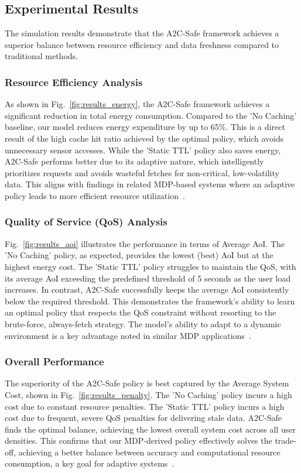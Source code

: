\documentclass[journal]{IEEEtran}
\begin{document}
\subsection{Experimental Results}
The simulation results demonstrate that the A2C-Safe framework achieves a superior balance between resource efficiency and data freshness compared to traditional methods.

\subsubsection{Resource Efficiency Analysis}
As shown in Fig.~\ref{fig:results_energy}, the A2C-Safe framework achieves a significant reduction in total energy consumption. Compared to the 'No Caching' baseline, our model reduces energy expenditure by up to 65\%. This is a direct result of the high cache hit ratio achieved by the optimal policy, which avoids unnecessary sensor accesses. While the 'Static TTL' policy also saves energy, A2C-Safe performs better due to its adaptive nature, which intelligently prioritizes requests and avoids wasteful fetches for non-critical, low-volatility data. This aligns with findings in related MDP-based systems where an adaptive policy leads to more efficient resource utilization~\cite{cite: 1058, 1104}.

\subsubsection{Quality of Service (QoS) Analysis}
Fig.~\ref{fig:results_aoi} illustrates the performance in terms of Average AoI. The 'No Caching' policy, as expected, provides the lowest (best) AoI but at the highest energy cost. The 'Static TTL' policy struggles to maintain the QoS, with its average AoI exceeding the predefined threshold of 5 seconds as the user load increases. In contrast, A2C-Safe successfully keeps the average AoI consistently below the required threshold. This demonstrates the framework's ability to learn an optimal policy that respects the QoS constraint without resorting to the brute-force, always-fetch strategy. The model's ability to adapt to a dynamic environment is a key advantage noted in similar MDP applications~\cite{cite: 679, 708}.

\subsubsection{Overall Performance}
The superiority of the A2C-Safe policy is best captured by the Average System Cost, shown in Fig.~\ref{fig:results_penalty}. The 'No Caching' policy incurs a high cost due to constant resource penalties. The 'Static TTL' policy incurs a high cost due to frequent, severe QoS penalties for delivering stale data. A2C-Safe finds the optimal balance, achieving the lowest overall system cost across all user densities. This confirms that our MDP-derived policy effectively solves the trade-off, achieving a better balance between accuracy and computational resource consumption, a key goal for adaptive systems~\cite{cite: 1222}.
\end{document}
